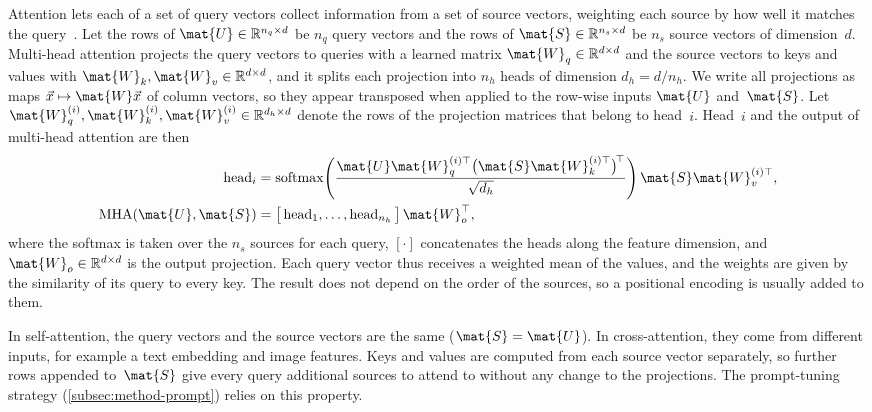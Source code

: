 Attention lets each of a set of query vectors collect information from a set of source vectors, weighting each source by how well it matches the query~\cite{NIPS2017_3f5ee243}.
Let the rows of $\mat{U} \in \mathbb{R}^{n_q \times d}$ be $n_q$ query vectors and the rows of $\mat{S} \in \mathbb{R}^{n_s \times d}$ be $n_s$ source vectors of dimension~$d$.
Multi-head attention projects the query vectors to queries with a learned matrix $\mat{W}_q \in \mathbb{R}^{d \times d}$ and the source vectors to keys and values with $\mat{W}_k, \mat{W}_v \in \mathbb{R}^{d \times d}$, and it splits each projection into $n_h$ heads of dimension $d_h = d / n_h$.
We write all projections as maps $\vec{x} \mapsto \mat{W}\vec{x}$ of column vectors, so they appear transposed when applied to the row-wise inputs $\mat{U}$ and~$\mat{S}$.
Let $\mat{W}_q^{(i)}, \mat{W}_k^{(i)}, \mat{W}_v^{(i)} \in \mathbb{R}^{d_h \times d}$ denote the rows of the projection matrices that belong to head~$i$.
Head~$i$ and the output of multi-head attention are then
\begin{equation}
\begin{aligned}
\operatorname{head}_i &= \operatorname{softmax}\!\left( \frac{\mat{U}\mat{W}_q^{(i)\top} \big(\mat{S}\mat{W}_k^{(i)\top}\big)^{\!\top}}{\sqrt{d_h}} \right) \mat{S}\mat{W}_v^{(i)\top},\\
\operatorname{MHA}(\mat{U}, \mat{S}) &= \big[\operatorname{head}_1, \dots, \operatorname{head}_{n_h}\big]\, \mat{W}_o^{\top},
\end{aligned}
\label{eq:bg-attention}
\end{equation}
where the softmax is taken over the $n_s$ sources for each query, $[\cdot]$ concatenates the heads along the feature dimension, and $\mat{W}_o \in \mathbb{R}^{d \times d}$ is the output projection.
Each query vector thus receives a weighted mean of the values, and the weights are given by the similarity of its query to every key.
The result does not depend on the order of the sources, so a positional encoding is usually added to them.

In self-attention, the query vectors and the source vectors are the same ($\mat{S} = \mat{U}$).
In cross-attention, they come from different inputs, for example a text embedding and image features.
Keys and values are computed from each source vector separately, so further rows appended to~$\mat{S}$ give every query additional sources to attend to without any change to the projections.
The prompt-tuning strategy (\cref{subsec:method-prompt}) relies on this property.

